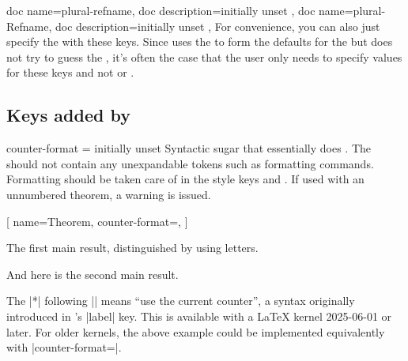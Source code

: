 \documentclass{ltxdoc}
\newcommand{\ttbraces}[1]{\braces{\texttt{#1}}}
\begin{document}
\begin{docKeys}[doc parameter={=\meta{plural name}}]
  {
    { doc name=plural-refname, doc description=initially unset },
    { doc name=plural-Refname, doc description=initially unset },
  }
For convenience, you can also just specify the  with these keys.
Since  uses the  to form the defaults for the  but does not try to guess the , it's often the case that the user only needs to specify values for these keys and not  or .
\end{docKeys}

\subsection{Keys added by } \label{thm-added-keys}

\begin{docKey}{counter-format}
  {=}
  {initially unset}
Syntactic sugar that essentially does \ttbraces{\cs{the}\meta{counter}}.
The  should not contain any unexpandable tokens such as formatting commands.
Formatting should be taken care of in the style keys  and .
If used with an unnumbered theorem, a warning is issued.

\begin{codepreamble}
[
  name=Theorem,
  counter-format=\Alph*,
  ]
\end{codepreamble}

\begin{keythmscode}[withpreamble]
\begin{mainthm}
The first main result, distinguished by using letters.
\end{mainthm}
\begin{mainthm}
And here is the second main result.
\end{mainthm}
\end{keythmscode}

The |*| following |\Alph| means ``use the current counter'', a syntax originally introduced in 's |label| key.
This is available with a \LaTeX{} kernel 2025-06-01 or later.
For older kernels, the above example could be implemented equivalently with |counter-format=|.
\end{docKey}
\end{document}
